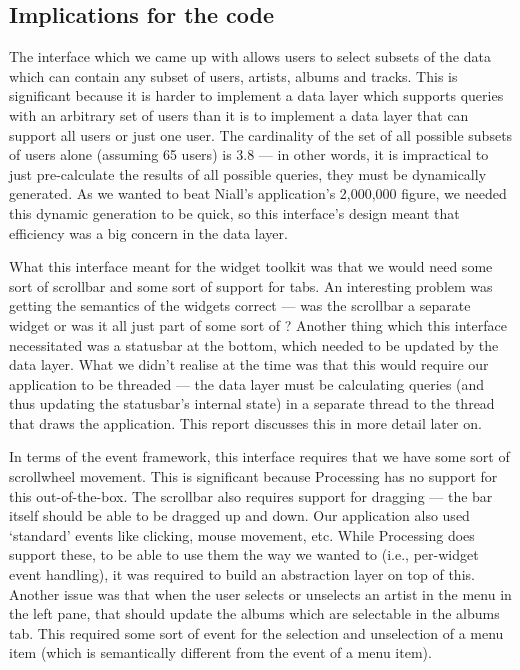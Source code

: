 \subsection{Implications for the code}
The interface which we came up with allows users to select subsets of the data which can contain any subset of users, artists, albums and tracks. This is significant because it is harder to implement a data layer which supports queries with an arbitrary set of users than it is to implement a data layer that can support all users or just one user. The cardinality of the set of all possible subsets of users alone (assuming 65 users) is 3.8 --- in other words, it is impractical to just pre-calculate the results of all possible queries, they must be dynamically generated. As we wanted to beat Niall's application's 2,000,000 figure, we needed this dynamic generation to be quick, so this interface's design meant that efficiency was a big concern in the data layer.

What this interface meant for the widget toolkit was that we would need some sort of scrollbar and some sort of support for tabs. An interesting problem was getting the semantics of the widgets correct --- was the scrollbar a separate widget or was it all just part of some sort of ? Another thing which this interface necessitated was a statusbar at the bottom, which needed to be updated by the data layer. What we didn't realise at the time was that this would require our application to be threaded --- the data layer must be calculating queries (and thus updating the statusbar's internal state) in a separate thread to the thread that draws the application. This report discusses this in more detail later on.

In terms of the event framework, this interface requires that we have some sort of scrollwheel movement. This is significant because Processing has no support for this out-of-the-box. The scrollbar also requires support for dragging --- the bar itself should be able to be dragged up and down. Our application also used `standard' events like clicking, mouse movement, etc. While Processing does support these, to be able to use them the way we wanted to (i.e., per-widget event handling), it was required to build an abstraction layer on top of this. Another issue was that when the user selects or unselects an artist in the menu in the left pane, that should update the albums which are selectable in the albums tab. This required some sort of event for the selection and unselection of a menu item (which is semantically different from the  event of a menu item).


